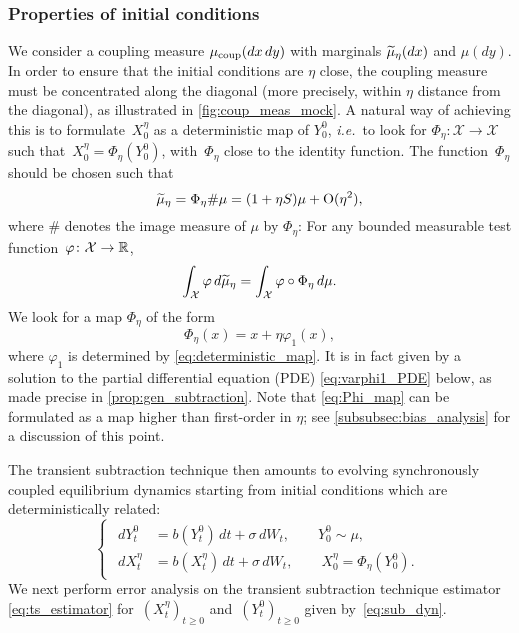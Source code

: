 \subsubsection{Properties of initial conditions}
\label{subsubsec:properties_init_cond}
%
We consider a coupling measure $\mu_{\rm coup}(dx \, dy)$ with marginals $\widetilde{\mu}_\eta(dx)$ and $\mu(dy)$. In order to ensure that the initial conditions are $\eta$ close, the coupling measure must be concentrated along the diagonal (more precisely, within $\eta$ distance from the diagonal), as illustrated in \cref{fig:coup_meas_mock}. A natural way of achieving this is to formulate~$X_0^\eta$ as a deterministic map of $Y_0^0$, \emph{i.e.}\ to look for $\Phi_\eta \colon \mathcal{X} \to \mathcal{X}$ such that~$X_0^\eta = \Phi_\eta(Y_0^0)$, with~$\Phi_\eta$ close to the identity function. The function~$\Phi_\eta$ should be chosen such that
%
\begin{equation}
	\widetilde{\mu}_\eta = \Phi_\eta \# \mu = (1+\eta S)\mu + \mathrm{O}(\eta^2),
	\label{eq:deterministic_map}
\end{equation}
%
where $\#$ denotes the image measure of $\mu$ by $\Phi_\eta$: For any bounded measurable test function~$\varphi\colon \mathcal{X} \to \mathbb{R}$,
%
\begin{equation}
	\int_\mathcal{X} \varphi \, d\widetilde{\mu}_\eta = \int_\mathcal{X} \varphi \circ \Phi_\eta \, d\mu.
\end{equation}
%
We look for a map $\Phi_\eta$ of the form
%
\begin{equation}
	\Phi_\eta(x) = x + \eta\varphi_1(x),
	\label{eq:Phi_map}
\end{equation}
%
where $\varphi_1$ is determined by \eqref{eq:deterministic_map}. It is in fact given by a solution to the partial differential equation (PDE) \eqref{eq:varphi1_PDE} below, as made precise in \cref{prop:gen_subtraction}.
%
Note that \eqref{eq:Phi_map} can be formulated as a map higher than first-order in $\eta$; see \cref{subsubsec:bias_analysis} for a discussion of this point.

The transient subtraction technique then amounts to evolving synchronously coupled equilibrium dynamics starting from initial conditions which are deterministically related:
%
\begin{equation}
\begin{cases}
\begin{aligned}
	dY_t^0 &= b(Y_t^0) \, dt + \sigma \, dW_t, \qquad Y_0^0 \sim \mu, \\
	dX_t^\eta &= b(X_t^\eta) \, dt + \sigma \, dW_t, \qquad X_0^\eta = \Phi_\eta(Y_0^0).
\end{aligned}
\end{cases}
\label{eq:sub_dyn}
\end{equation}
%
We next perform error analysis on the transient subtraction technique estimator \eqref{eq:ts_estimator} for~$(X_t^\eta)_{t\geq 0}$ and~$(Y_t^0)_{t\geq 0}$ given by~\eqref{eq:sub_dyn}.
 
